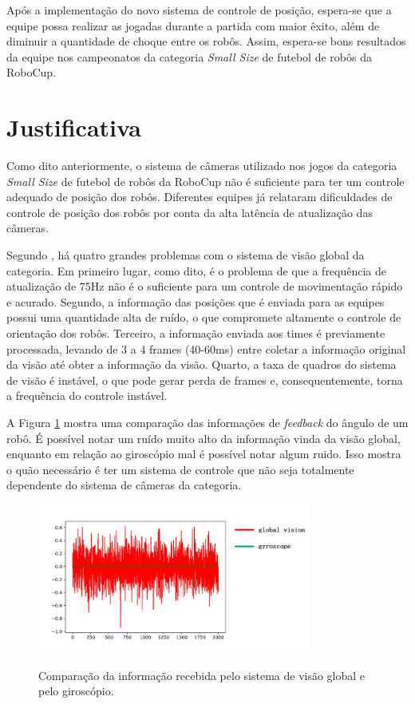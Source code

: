\documentclass[acronym, symbols]{fei}
\begin{document}
		Após a implementação do novo sistema de controle de posição, espera-se que a equipe possa realizar as jogadas durante a partida com maior êxito, além de diminuir a quantidade de choque entre os robôs. Assim, espera-se bons resultados da equipe nos campeonatos da categoria \textit{Small Size} de futebol de robôs da RoboCup.
		
	\section{Justificativa}
	
		Como dito anteriormente, o sistema de câmeras utilizado nos jogos da categoria \textit{Small Size} de futebol de robôs da RoboCup não é suficiente para ter um controle adequado de posição dos robôs. Diferentes equipes já relataram dificuldades de controle de posição dos robôs por conta da alta latência de atualização das câmeras.
		
		Segundo \textcite{tdpZJUNlict2020}, há quatro grandes problemas com o sistema de visão global da categoria. Em primeiro lugar, como dito, é o problema de que a frequência de atualização de 75Hz não é o suficiente para um controle de movimentação rápido e acurado. Segundo, a informação das posições que é enviada para as equipes possui uma quantidade alta de ruído, o que compromete altamente o controle de orientação dos robôs. Terceiro, a informação enviada aos times é previamente processada, levando de 3 a 4 frames (40-60ms) entre coletar a informação original da visão até obter a informação da visão. Quarto, a taxa de quadros do sistema de visão é instável, o que pode gerar perda de frames e, consequentemente, torna a frequência do controle instável.
		
		A Figura \ref{fig:comparison_cameras_gyroscope} mostra uma comparação das informações de \textit{feedback} do ângulo de um robô. É possível notar um ruído muito alto da informação vinda da visão global, enquanto em relação ao giroscópio mal é possível notar algum ruido. Isso mostra o quão necessário é ter um sistema de controle que não seja totalmente dependente do sistema de câmeras da categoria.
		
		\begin{figure}[!htb]
			\centering
			\caption{Comparação da informação recebida pelo sistema de visão global e pelo giroscópio.} 
			\includegraphics[width=0.8\textwidth]{Comparacao_cameras_giroscopio.png}
			\label{fig:comparison_cameras_gyroscope}
		\end{figure}
	
\end{document}
